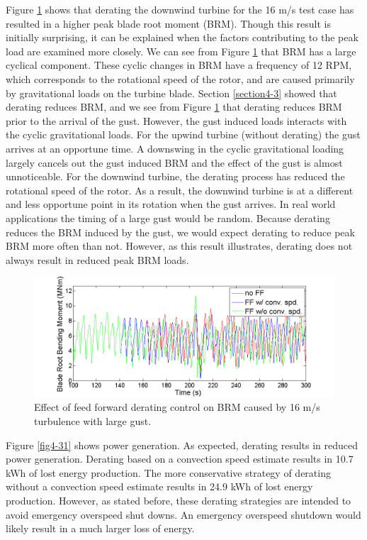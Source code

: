 Figure \ref{fig4-30} shows that derating the downwind turbine for the 16 m/s test case has resulted in a higher peak blade root moment (BRM). Though this result is initially surprising, it can be explained when the factors contributing to the peak load are examined more closely. We can see from Figure \ref{fig4-30} that BRM has a large cyclical component. These cyclic changes in BRM have a frequency of 12 RPM, which corresponds to the rotational speed of the rotor, and are caused primarily by gravitational loads on the turbine blade. Section \ref{section4-3} showed that derating reduces BRM, and we see from Figure \ref{fig4-30} that derating reduces BRM prior to the arrival of the gust. However, the gust induced loads interacts with the cyclic gravitational loads. For the upwind turbine (without derating) the gust arrives at an opportune time. A downswing in the cyclic gravitational loading largely cancels out the gust induced BRM and the effect of the gust is almost unnoticeable. For the downwind turbine, the derating process has reduced the rotational speed of the rotor. As a result, the downwind turbine is at a different and less opportune point in its rotation when the gust arrives. In real world applications the timing of a large gust would be random. Because derating reduces the BRM induced by the gust, we would expect derating to reduce peak BRM more often than not. However, as this result illustrates, derating does not always result in reduced peak BRM loads.

\begin{figure}[htb]
	\centering
		\includegraphics[width = \linewidth]{Figures/ch4Figures/fig4-30.png}
		
	\caption{Effect of feed forward derating control on BRM caused by 16 m/s turbulence with large gust.}
	\label{fig4-30}
\end{figure}

Figure \ref{fig4-31} shows power generation. As expected, derating results in reduced power generation. Derating based on a convection speed estimate results in 10.7 kWh of lost energy production. The more conservative strategy of derating without a convection speed estimate results in 24.9 kWh of lost energy production. However, as stated before, these derating strategies are intended to avoid emergency overspeed shut downs. An emergency overspeed shutdown would likely result in a much larger loss of energy.


